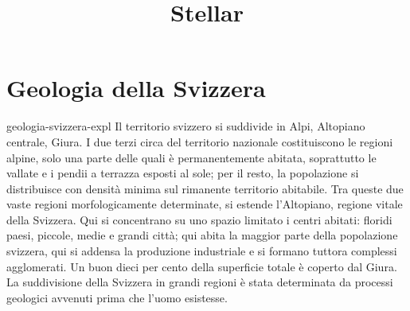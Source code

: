\documentclass[preview]{standalone}
\begin{document}
\title{Stellar}
\genpage

\section{Geologia della Svizzera}

\begin{snippet}{geologia-svizzera-expl}
    Il territorio svizzero si suddivide in Alpi, Altopiano centrale, Giura. I due terzi circa del territorio
    nazionale costituiscono le regioni alpine, solo una parte delle quali è permanentemente abitata,
    soprattutto le vallate e i pendii a terrazza esposti al sole; per il resto, la popolazione si distribuisce
    con densità minima sul rimanente territorio abitabile. Tra queste due vaste regioni
    morfologicamente determinate, si estende l'Altopiano, regione vitale della Svizzera. Qui si
    concentrano su uno spazio limitato i centri abitati: floridi paesi, piccole, medie e grandi città; qui
    abita la maggior parte della popolazione svizzera, qui si addensa la produzione industriale e si
    formano tuttora complessi agglomerati. Un buon dieci per cento della superficie totale è coperto
    dal Giura. La suddivisione della Svizzera in grandi regioni è stata determinata da processi geologici
    avvenuti prima che l'uomo esistesse.
\end{snippet}
\end{document}
